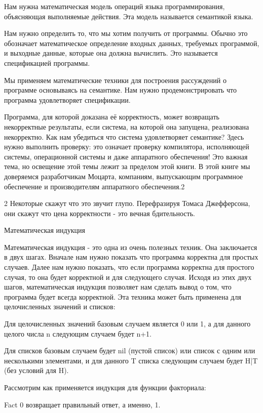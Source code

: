 Нам нужна математическая модель операций языка программирования, объясняющая выполняемые действия. Эта модель называется семантикой языка.

Нам нужно определить то, что мы хотим получить от программы. Обычно это обозначает математическое определение входных данных, требуемых программой, и выходные данные, которые она должна вычислить. Это называется спецификацией программы.

Мы применяем математические техники для построения рассуждений о программе основываясь на семантике. Нам нужно продемонстрировать что программа удовлетворяет спецификации.

Программа, для которой доказана её корректность, может возвращать некорректные результаты, если система, на которой она запущена, реализована некорректно. Как нам убедиться что система удовлетворяет семантике? Здесь нужно выполнить проверку: это означает проверку компилятора, исполняющей системы, операционной системы и даже аппаратного обеспечения! Это важная тема, но освещение этой темы лежит за пределом этой книги. В этой книге мы доверяемся разработчикам Моцарта, компаниям, выпускающим программное обеспечение и производителям аппаратного обеспечения.2

2 Некоторые скажут что это звучит глупо. Перефразируя Томаса Джефферсона, они скажут что цена корректности - это вечная бдительность.

Математическая индукция

Математическая индукция - это одна из очень полезных техник. Она заключается в двух шагах. Вначале нам нужно показать что программа корректна для простых случаев. Далее нам нужно показать, что если программа корректна для простого случая, то она будет корректной и для следующего случая. Исходя из этих двух шагов, математическая индукция позволяет нам сделать вывод о том, что программа будет всегда корректной. Эта техника может быть применена для целочисленных значений и списков:

Для целочисленных значений базовым случаем является 0 или 1, а для данного целого числа n следующим случаем будет n+1.

Для списков базовым случаем будет nil (пустой список) или список с одним или несколькими элементами, и для данного T списка следующим случаем будет H|T (без условий для H).

Рассмотрим как применяется индукция для функции факториала:

{Fact 0} возвращает правильный ответ, а именно, 1.

